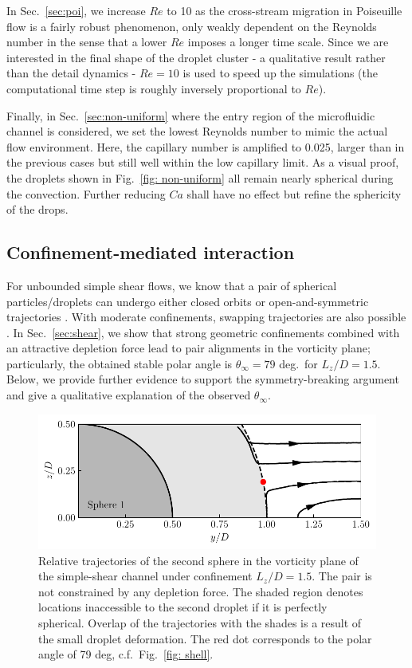 In Sec.\ \ref{sec:poi}, we increase $Re$ to 10 as the cross-stream migration in Poiseuille flow is a fairly robust phenomenon, only weakly dependent on the Reynolds number in the sense that a lower $Re$ imposes a longer time scale. Since we are interested in the final shape of the droplet cluster - a qualitative result rather than the detail dynamics - $Re=10$ is used to speed up the simulations (the computational time step is roughly inversely proportional to $Re$).

Finally, in Sec.\ \ref{sec:non-uniform} where the entry region of the microfluidic channel is considered, we set the lowest Reynolds number to mimic the actual flow environment. Here, the capillary number is amplified to 0.025, larger than in the previous cases but still well within the low capillary limit. As a visual proof, the droplets shown in Fig.\ \ref{fig: non-uniform} all remain nearly spherical during the convection. Further reducing $Ca$ shall have no effect but refine the sphericity of the drops.


\subsection{Confinement-mediated interaction} \label{app:trajectory}

For unbounded simple shear flows, we know that a pair of spherical particles/droplets can undergo either closed orbits or open-and-symmetric trajectories \cite{batchelor_green_1972,Zinchenko1984}. With moderate confinements, swapping trajectories are also possible \cite{zurita-gotor_2007}. In Sec.\ \ref{sec:shear}, we show that strong geometric confinements combined with an attractive depletion force lead to pair alignments in the vorticity plane; particularly, the obtained stable polar angle is $\theta_\infty=79$ deg.\ for $L_z/D=1.5$. Below, we provide further evidence to support the symmetry-breaking argument and give a qualitative explanation of the observed $\theta_\infty$.

\begin{figure}[t]
 \centering
 \includegraphics[width=.85\columnwidth]{figs/traj.pdf}
 \caption{Relative trajectories of the second sphere in the vorticity plane of the simple-shear channel under confinement $L_z/D=1.5$. The pair is not constrained by any depletion force. The shaded region denotes locations inaccessible to the second droplet if it is perfectly spherical. Overlap of the trajectories with the shades is a result of the small droplet deformation. The red dot corresponds to the polar angle of 79 deg, c.f.\ Fig.\ \ref{fig: shell}.}
 \label{fig: traj}
\end{figure}


